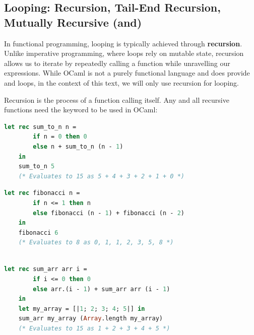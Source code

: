 \newpage 
    
\subsection{Looping: Recursion, Tail-End Recursion, Mutually Recursive (and)}

In functional programming, looping is typically achieved through \textbf{recursion}. Unlike imperative programming, where loops rely on mutable state, 
recursion allows us to iterate by repeatedly calling a function while unravelling our expressions. While OCaml is not a purely functional language and does provide  and  loops, 
in the context of this text, we will only use recursion for looping.

\vspace{2em}
\begin{Def}

Recursion is the process of a function calling itself. Any and all recursive functions need the keyword
 to be used in OCaml:

\noindent

\begin{lstlisting}[language=OCaml, caption={Summing to $n$ Using Recursion}, numbers=none]
    let rec sum_to_n n =
        if n = 0 then 0
        else n + sum_to_n (n - 1)
    in 
    sum_to_n 5
    (* Evaluates to 15 as 5 + 4 + 3 + 2 + 1 + 0 *)
\end{lstlisting}

\begin{lstlisting}[language=OCaml, caption={Fibonacci Sequence Using Recursion}, numbers=none]
    let rec fibonacci n =
        if n <= 1 then n
        else fibonacci (n - 1) + fibonacci (n - 2)
    in 
    fibonacci 6
    (* Evaluates to 8 as 0, 1, 1, 2, 3, 5, 8 *)
    
\end{lstlisting}

\begin{lstlisting}[language=OCaml, caption={Sum an Array of Integers Using Recursion}, numbers=none]
    let rec sum_arr arr i =
        if i <= 0 then 0
        else arr.(i - 1) + sum_arr arr (i - 1)
    in
    let my_array = [|1; 2; 3; 4; 5|] in
    sum_arr my_array (Array.length my_array)
    (* Evaluates to 15 as 1 + 2 + 3 + 4 + 5 *)
\end{lstlisting}

\end{Def}

